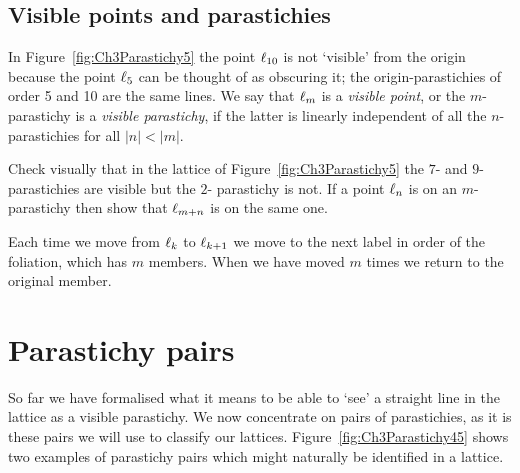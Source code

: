 \subsection{Visible points and parastichies}
In Figure~\ref{fig:Ch3Parastichy5} the point $\ell_{{10}}$ is not `visible' from the origin because the point $\ell_{{5}}$ can be thought of as obscuring it; the 
origin-parastichies of order 5 and 10 are the same lines. 
We say that $\ell_{{m}}$ is a \emph{visible point}, or the $m$-parastichy is a \emph{visible parastichy}, if the latter is linearly independent of all the $n$-parastichies for all $|n|<|m|$. 
\begin{jExercise}
	Check  visually that in the lattice of Figure~\ref{fig:Ch3Parastichy5} the $7$- and $9$- parastichies are visible but the $2$- parastichy is not.
If a point $\ell_{{n}}$ is on an $m$-parastichy then show that $\ell_{{m+n}}$ is on the same one.
\label{ex:bb}
\end{jExercise}
\begin{jAnswer}
	Each time we move from $\ell_{{k}}$ to $\ell_{{k+1}}$ we move to the next label in order of the foliation, which has $m$ members. When we have moved $m$ times we return to the original member.
\end{jAnswer}




\clearpage
\section{Parastichy pairs}

So far we have formalised what it means to be able to `see' a straight line in the lattice as a visible parastichy. 
We now concentrate on pairs of parastichies, as it is these pairs we will use to classify our lattices. Figure~\ref{fig:Ch3Parastichy45} shows two examples of parastichy pairs which might naturally be identified in a lattice. 





